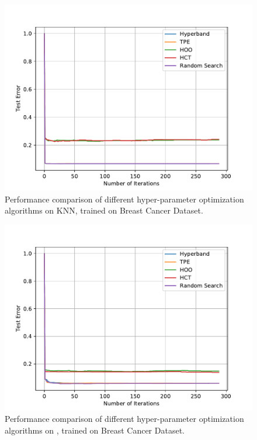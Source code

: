 \documentclass[twoside,11pt]{article}
\begin{document}
\begin{figure}[ht]
    \centering
    \includegraphics[scale=0.8]{img/uci/knn_1.pdf}
    \caption{Performance comparison of different hyper-parameter optimization algorithms on KNN, trained on Breast Cancer Dataset.}
    \label{knn_1}
\end{figure}

\begin{figure}[ht]
    \centering
    \includegraphics[scale=0.8]{img/uci/sk_mlp_1.pdf}
    \caption{Performance comparison of different hyper-parameter optimization algorithms on \MLP, trained on Breast Cancer Dataset.}
    \label{sk_mlp_1}
\end{figure}
\end{document}
